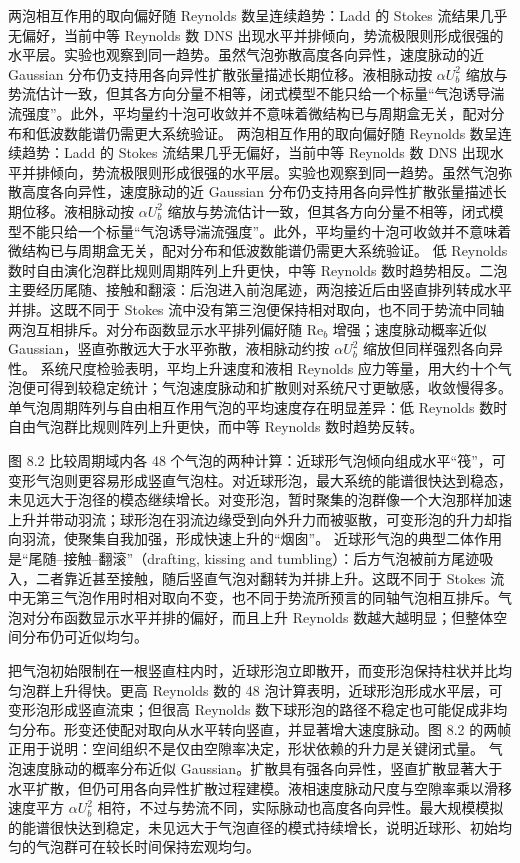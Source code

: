 \documentclass[11pt,a4paper,openany,fontset=none]{ctexbook}
\begin{document}
两泡相互作用的取向偏好随 Reynolds 数呈连续趋势：Ladd 的 Stokes 流结果几乎无偏好，当前中等 Reynolds 数 DNS 出现水平并排倾向，势流极限则形成很强的水平层。实验也观察到同一趋势。虽然气泡弥散高度各向异性，速度脉动的近 Gaussian 分布仍支持用各向异性扩散张量描述长期位移。液相脉动按 $\alpha U_b^2$ 缩放与势流估计一致，但其各方向分量不相等，闭式模型不能只给一个标量“气泡诱导湍流强度”。此外，平均量约十泡可收敛并不意味着微结构已与周期盒无关，配对分布和低波数能谱仍需更大系统验证。
两泡相互作用的取向偏好随 Reynolds 数呈连续趋势：Ladd 的 Stokes 流结果几乎无偏好，当前中等 Reynolds 数 DNS 出现水平并排倾向，势流极限则形成很强的水平层。实验也观察到同一趋势。虽然气泡弥散高度各向异性，速度脉动的近 Gaussian 分布仍支持用各向异性扩散张量描述长期位移。液相脉动按 $\alpha U_b^2$ 缩放与势流估计一致，但其各方向分量不相等，闭式模型不能只给一个标量“气泡诱导湍流强度”。此外，平均量约十泡可收敛并不意味着微结构已与周期盒无关，配对分布和低波数能谱仍需更大系统验证。
低 Reynolds 数时自由演化泡群比规则周期阵列上升更快，中等 Reynolds 数时趋势相反。二泡主要经历尾随、接触和翻滚：后泡进入前泡尾迹，两泡接近后由竖直排列转成水平并排。这既不同于 Stokes 流中没有第三泡便保持相对取向，也不同于势流中同轴两泡互相排斥。对分布函数显示水平排列偏好随 $\mathrm{Re}_b$ 增强；速度脉动概率近似 Gaussian，竖直弥散远大于水平弥散，液相脉动约按 $\alpha U_b^2$ 缩放但同样强烈各向异性。
系统尺度检验表明，平均上升速度和液相 Reynolds 应力等量，用大约十个气泡便可得到较稳定统计；气泡速度脉动和扩散则对系统尺寸更敏感，收敛慢得多。单气泡周期阵列与自由相互作用气泡的平均速度存在明显差异：低 Reynolds 数时自由气泡群比规则阵列上升更快，而中等 Reynolds 数时趋势反转。

图 8.2 比较周期域内各 48 个气泡的两种计算：近球形气泡倾向组成水平“筏”，可变形气泡则更容易形成竖直气泡柱。对近球形泡，最大系统的能谱很快达到稳态，未见远大于泡径的模态继续增长。对变形泡，暂时聚集的泡群像一个大泡那样加速上升并带动羽流；球形泡在羽流边缘受到向外升力而被驱散，可变形泡的升力却指向羽流，使聚集自我加强，形成快速上升的“烟囱”。
近球形气泡的典型二体作用是“尾随--接触--翻滚”（drafting, kissing and tumbling）：后方气泡被前方尾迹吸入，二者靠近甚至接触，随后竖直气泡对翻转为并排上升。这既不同于 Stokes 流中无第三气泡作用时相对取向不变，也不同于势流所预言的同轴气泡相互排斥。气泡对分布函数显示水平并排的偏好，而且上升 Reynolds 数越大越明显；但整体空间分布仍可近似均匀。

把气泡初始限制在一根竖直柱内时，近球形泡立即散开，而变形泡保持柱状并比均匀泡群上升得快。更高 Reynolds 数的 48 泡计算表明，近球形泡形成水平层，可变形泡形成竖直流束；但很高 Reynolds 数下球形泡的路径不稳定也可能促成非均匀分布。形变还使配对取向从水平转向竖直，并显著增大速度脉动。图 8.2 的两帧正用于说明：空间组织不是仅由空隙率决定，形状依赖的升力是关键闭式量。
气泡速度脉动的概率分布近似 Gaussian。扩散具有强各向异性，竖直扩散显著大于水平扩散，但仍可用各向异性扩散过程建模。液相速度脉动尺度与空隙率乘以滑移速度平方 $\alpha U_b^2$ 相符，不过与势流不同，实际脉动也高度各向异性。最大规模模拟的能谱很快达到稳定，未见远大于气泡直径的模式持续增长，说明近球形、初始均匀的气泡群可在较长时间保持宏观均匀。
\end{document}
